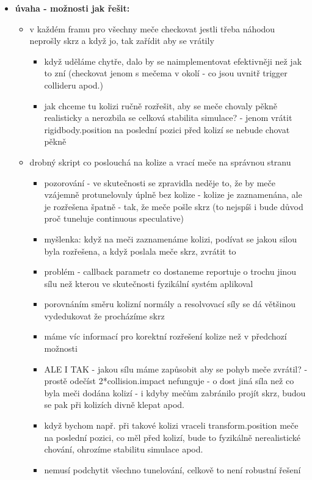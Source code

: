 \begin{itemize}
  \item \textbf{úvaha - možnosti jak řešit:}
  \begin{itemize}
    \item v každém framu pro všechny meče checkovat jestli třeba náhodou neprošly skrz a když jo, tak zařídit aby se vrátily
      \begin{itemize}
        \item když uděláme chytře, dalo by se naimplementovat efektivněji než jak to zní (checkovat jenom s mečema v okolí - co jsou uvnitř trigger collideru apod.)
        \item jak chceme tu kolizi ručně rozřešit, aby se meče chovaly pěkně realisticky a nerozbila se celková stabilita simulace? - jenom vrátit rigidbody.position na poslední pozici před kolizí se nebude chovat pěkně
      \end{itemize}
    \item drobný skript co poslouchá na kolize a vrací meče na správnou stranu
      \begin{itemize}
        \item pozorování - ve skutečnosti se zpravidla neděje to, že by meče vzájemně protunelovaly úplně bez kolize - kolize je zaznamenána, ale je rozřešena špatně - tak, že meče pošle skrz (to nejspíš i bude důvod proč tuneluje continuous speculative)
        \item myšlenka: když na meči zaznamenáme kolizi, podívat se jakou silou byla rozřešena, a když poslala meče skrz, zvrátit to
        \item problém - callback parametr co dostaneme reportuje o trochu jinou sílu než kterou ve skutečnosti fyzikální systém aplikoval
        \item porovnáním směru kolizní normály a resolvovací síly se dá většinou vydedukovat že procházíme skrz
        \item máme víc informací pro korektní rozřešení kolize než v předchozí možnosti
        \item ALE I TAK - jakou sílu máme zapůsobit aby se pohyb meče zvrátil? - prostě odečíst 2*collision.impact nefunguje - o dost jiná síla než co byla meči dodána kolizí - i kdyby mečům zabránilo projít skrz, budou se pak při kolizích divně klepat apod.
        \item když bychom např. při takové kolizi vraceli transform.position meče na poslední pozici, co měl před kolizí, bude to fyzikálně nerealistické chování, ohrozíme stabilitu simulace apod.
        \item nemusí podchytit všechno tunelování, celkově to není robustní řešení

\end{itemize}
\end{itemize}
\end{itemize}
